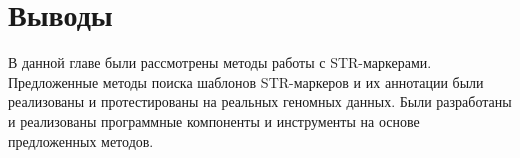 \section{Выводы}

В данной главе были рассмотрены методы работы с STR-маркерами. Предложенные методы поиска шаблонов
STR-маркеров и их аннотации были реализованы и протестированы на реальных геномных данных.
Были разработаны и реализованы программные компоненты и инструменты на основе предложенных методов.
